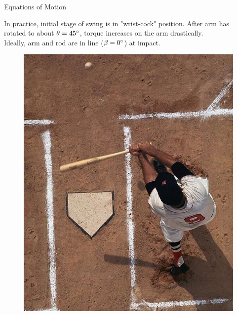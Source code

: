 \documentclass[tikz]{beamer}
\begin{document}
\begin{frame} {Equations of Motion}



	 {
		In practice, initial stage of swing is in "wrist-cock" position. After arm has rotated to about $\theta = 45 \degree$, torque increases on the arm drastically.\\
		\vspace{\baselineskip}
		Ideally, arm and rod are in line ($\beta = 0 \degree$) at impact.
		\begin{figure}
			\centering
			\includegraphics[scale=0.2]{aerialswing.jpg}
		\end{figure}
	}

\end{frame}
\end{document}
